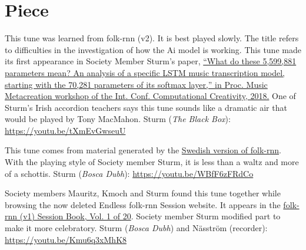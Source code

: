 \documentclass[a4paper,notitlepage,twoside]{book}
\begin{document}
\section{Piece}
{}  
\hypertarget{piece:WhyAreYou}{}
This tune was learned from folk-rnn (v2). 
It is best played slowly.
The title refers to difficulties in the investigation of how the Ai model is working.
This tune made its first appearance in Society Member Sturm's paper, 
\href{http://urn.kb.se/resolve?urn=urn:nbn:se:kth:diva-238604}
{``What do these 5,599,881 parameters mean? 
An analysis of a specific LSTM music transcription model, 
starting with the 70,281 parameters of its softmax layer,” 
in Proc. Music Metacreation workshop of the Int. Conf. Computational Creativity, 2018.}
One of Sturm's Irish accordion teachers says this tune sounds like a dramatic air
that would be played by Tony MacMahon.
Sturm ({\em The Black Box}): \url{https://youtu.be/tXmEvGwseuU}

{}  
  
\hypertarget{piece:SjallosasSchottis}{}
This tune comes from material generated by the \href{https://themachinefolksession.org/tune/1012}{Swedish version of folk-rnn}.
With the playing style of Society member Sturm, it is less than a waltz and more of a schottis.
Sturm ({\em Bosca Dubh}): \url{https://youtu.be/WBfF6zFRdCo}

{}  
Society members Mauritz, Kmoch and Sturm found this tune together 
while browsing the now deleted Endless folk-rnn Session website.
It appears in the \href{https://highnoongmt.wordpress.com/2018/01/05/volumes-1-20-of-folk-rnn-v1-transcriptions}{folk-rnn (v1) Session Book, Vol. 1 of 20}.
Society member Sturm modified part to make it more celebratory.
Sturm ({\em Bosca Dubh}) and Näsström (recorder): \url{https://youtu.be/Kmu6q3xMhK8}
\end{document}

